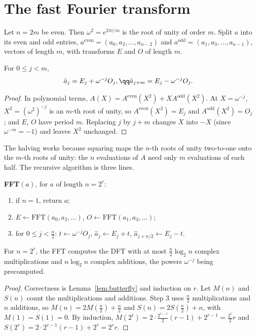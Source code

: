 \section{The fast Fourier transform}

Let $n=2m$ be even. Then $\omega^2=e^{2\pi i/m}$ is the root of unity of order $m$. Split $a$ into its even and odd entries,
$a^{\mathrm{even}}=(a_0,a_2,\dots,a_{n-2})$ and $a^{\mathrm{odd}}=(a_1,a_3,\dots,a_{n-1})$, vectors of length $m$, with transforms $E$ and $O$ of length $m$.

\begin{lemma}[butterfly]\label{lem:butterfly}
For $0\le j<m$,
\[
\begin{gathered}\hat a_j=E_j+\omega^{-j}O_j,\qq\hat a_{j+m}=E_j-\omega^{-j}O_j.\end{gathered}
\]
\end{lemma}
\begin{proof}
In polynomial terms, $A(X)=A^{\mathrm{even}}(X^2)+XA^{\mathrm{odd}}(X^2)$. At $X=\omega^{-j}$, $X^2=(\omega^2)^{-j}$ is an $m$-th root of unity, so
$A^{\mathrm{even}}(X^2)=E_j$ and $A^{\mathrm{odd}}(X^2)=O_j$; and $E$, $O$ have period $m$. Replacing $j$ by $j+m$ changes $X$ into $-X$ (since $\omega^{-m}=-1$)
and leaves $X^2$ unchanged.
\end{proof}

The halving works because squaring maps the $n$-th roots of unity two-to-one onto the $m$-th roots of unity: the $n$
evaluations of $A$ need only $m$ evaluations of each half. The recursive algorithm is three lines.

\begin{center}
\begin{minipage}{0.9\linewidth}
\textbf{FFT}$(a)$, for $a$ of length $n=2^r$:
\begin{enumerate}
\item if $n=1$, return $a$;
\item $E\gets\mathrm{FFT}(a_0,a_2,\dots)$, $O\gets\mathrm{FFT}(a_1,a_3,\dots)$;
\item for $0\le j<\frac n2$: $t\gets\omega^{-j}O_j$, $\hat a_j\gets E_j+t$, $\hat a_{j+n/2}\gets E_j-t$.
\end{enumerate}
\end{minipage}
\end{center}

\begin{theorem}\label{thm:fft}
For $n=2^r$, the FFT computes the DFT with at most $\frac n2\log_2n$ complex multiplications and $n\log_2n$ complex additions,
the powers $\omega^{-j}$ being precomputed.
\end{theorem}
\begin{proof}
Correctness is Lemma~\ref{lem:butterfly} and induction on $r$. Let $M(n)$ and $S(n)$ count the multiplications and additions.
Step 3 uses $\frac n2$ multiplications and $n$ additions, so $M(n)=2M(\frac n2)+\frac n2$ and $S(n)=2S(\frac n2)+n$, with $M(1)=S(1)=0$. By
induction, $M(2^r)=2\cdot\frac{2^{r-1}}2(r-1)+2^{r-1}=\frac{2^r}2r$ and $S(2^r)=2\cdot2^{r-1}(r-1)+2^r=2^rr$.
\end{proof}

